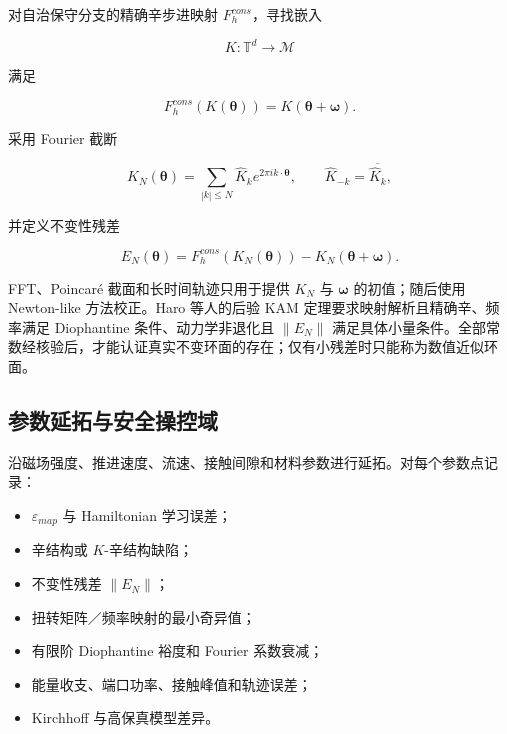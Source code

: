 对自治保守分支的精确辛步进映射 \(F_{h}^{cons}\)，寻找嵌入

\begin{equation}
\label{eq:symplectic-kam-5-16}
K:\mathbb{T}^{d} \rightarrow \mathcal{M}
\end{equation}

满足

\begin{equation}
\label{eq:symplectic-kam-5-17}
\boxed{F_{h}^{cons}\left( K\left( \bm{\theta} \right) \right) = K\left( \bm{\theta} + \bm{\omega} \right).}
\end{equation}

采用 Fourier 截断

\begin{equation}
\label{eq:symplectic-kam-5-18}
K_{N}\left( \bm{\theta} \right) = \sum_{|k| \leq N}^{}{\widehat{K}}_{k}e^{2\pi ik \cdot \bm{\theta}},\quad\quad{\widehat{K}}_{- k} = \overline{{\widehat{K}}_{k}},
\end{equation}

并定义不变性残差

\begin{equation}
\label{eq:symplectic-kam-5-19}
E_{N}\left( \bm{\theta} \right) = F_{h}^{cons}\left( K_{N}\left( \bm{\theta} \right) \right) - K_{N}\left( \bm{\theta} + \bm{\omega} \right).
\end{equation}

FFT、Poincaré 截面和长时间轨迹只用于提供 \(K_{N}\) 与 \(\bm{\omega}\) 的初值；随后使用 Newton-like 方法校正。Haro 等人的后验 KAM 定理要求映射解析且精确辛、频率满足 Diophantine 条件、动力学非退化且 \(\parallel E_{N} \parallel\) 满足具体小量条件。全部常数经核验后，才能认证真实不变环面的存在；仅有小残差时只能称为数值近似环面\cite{Haro2016Parameterization}。

\subsection{参数延拓与安全操控域}\label{sec:symplectic-kam-5-7}

沿磁场强度、推进速度、流速、接触间隙和材料参数进行延拓。对每个参数点记录：

\begin{itemize}
\tightlist
\item
  \(\varepsilon_{map}\) 与 Hamiltonian 学习误差；
\item
  辛结构或 \(K\)-辛结构缺陷；
\item
  不变性残差 \(\parallel E_{N} \parallel\)；
\item
  扭转矩阵／频率映射的最小奇异值；
\item
  有限阶 Diophantine 裕度和 Fourier 系数衰减；
\item
  能量收支、端口功率、接触峰值和轨迹误差；
\item
  Kirchhoff 与高保真模型差异。
\end{itemize}

